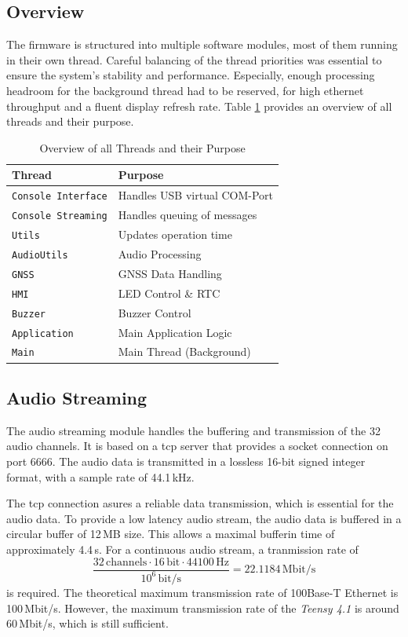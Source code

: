 \subsection{Overview}
The firmware is structured into multiple software modules, most of them running in their own thread.
Careful balancing of the thread priorities was essential to ensure the system's stability and performance.
Especially, enough processing headroom for the background thread had to be reserved, for high ethernet throughput and a fluent display refresh rate.
Table \ref{tab:threads} provides an overview of all threads and their purpose.
\begin{table}[h]
	\centering
	\begin{tabular}{|l|l|}
		\hline
		Thread                     & Purpose                      \\ \hline
		\texttt{Console Interface} & Handles USB virtual COM-Port \\ \hline
		\texttt{Console Streaming} & Handles queuing of messages  \\ \hline
		\texttt{Utils}             & Updates operation time       \\ \hline
		\texttt{AudioUtils}        & Audio Processing             \\ \hline
		\texttt{GNSS}              & GNSS Data Handling           \\ \hline
		\texttt{HMI}               & LED Control \& RTC           \\ \hline
		\texttt{Buzzer}            & Buzzer Control               \\ \hline
		\texttt{Application}       & Main Application Logic       \\ \hline
		\texttt{Main}              & Main Thread (Background)     \\ \hline
	\end{tabular}
	\caption{Overview of all Threads and their Purpose}
	\label{tab:threads}
\end{table}

\subsection{Audio Streaming}
The audio streaming module handles the buffering and transmission of the 32 audio channels.
It is based on a \acrshort{tcp} server that provides a socket connection on port 6666.
The audio data is transmitted in a lossless 16-bit signed integer format, with a sample rate of 44.1\,kHz.

The \acrshort{tcp} connection asures a reliable data transmission, which is essential for the audio data.
To provide a low latency audio stream, the audio data is buffered in a circular buffer of 12\,MB size.
This allows a maximal bufferin time of approximately 4.4\,s.
For a continuous audio stream, a tranmission rate of
\begin{equation}
	\frac{32\,\text{channels} \cdot 16\,\text{bit} \cdot 44100\,\text{Hz}}{10^6\,\text{bit/s}} = 22.1184\,\text{Mbit/s}
\end{equation}
is required.
The theoretical maximum transmission rate of 100Base-T Ethernet is 100\,Mbit/s.
However, the maximum transmission rate of the \textit{Teensy 4.1} is around 60\,Mbit/s, which is still sufficient.

